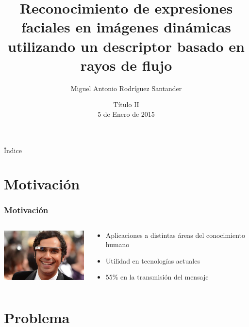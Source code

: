 \documentclass{beamer}
\title{Reconocimiento de expresiones faciales en imágenes dinámicas utilizando un descriptor basado en rayos de flujo}
\author{Miguel Antonio Rodríguez Santander}
\institute[Universidad Diego Portales] %
{%
  Universidad Diego Portales\\
  Facultad de Ingeniería\\
  Escuela de Informática y Telecomunicaciones
  
}
\date{Título II\\ 5 de Enero de 2015}
\begin{document}
\begin{frame}
  \titlepage
\end{frame}

\begin{frame}{Índice}
  \tableofcontents
\end{frame}




\section{Motivación}

\begin{frame}
  \frametitle{Motivación}
  \begin{columns}[onlytextwidth]
    \begin{column}{0.5\textwidth}
      \centering
      \includegraphics[width=5cm]{imagenes/google_glass.jpg}
    \end{column}
    \begin{column}{0.5\textwidth}
        \begin{itemize}
            \item Aplicaciones a distintas áreas del conocimiento humano
            \item Utilidad en tecnologías actuales
            \item 55\% en la transmisión del mensaje
        \end{itemize}
    \end{column}
  \end{columns}
\end{frame}


\section{Problema}
    
\end{document}
